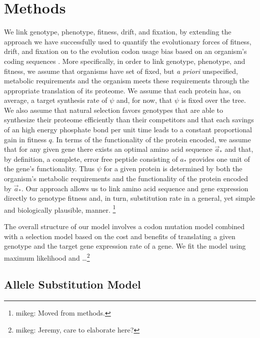 \documentclass{article}
\newcommand{\aopt}{\ensuremath{a_*}\xspace}
\newcommand{\aoptvec}{\ensuremath{\Vec{a}_*}\xspace}
\begin{document}
\section*{Methods}\label{sec:methods}
We link genotype, phenotype, fitness, drift, and fixation, by extending the approach we have successfully used to quantify the evolutionary forces of fitness, drift, and fixation  on to the evolution codon usage bias based on an organism's coding sequences \citep{GilchristAndWagner2006,Gilchrist2007,ShahAndGilchrist2011,GilchristEtAl2015}.
More specifically, in order to link genotype, phenotype, and fitness, we assume that organisms have set of fixed, but \emph{a priori} unspecified, metabolic requirements and the organism meets these requirements through the appropriate translation of its proteome.
We assume that each protein has, on average, a target synthesis rate of $\psi$ and, for now, that $\psi$ is fixed over the tree.
We also assume that natural selection favors genotypes that are able to synthesize their proteome efficiently than their competitors and that each savings of an high energy phosphate bond per unit time leads to a constant proportional gain in fitness $q$.
In terms of the functionality of the protein encoded, we assume that for any given gene there exists an optimal amino acid sequence \aoptvec and that, by definition, a complete, error free peptide consisting of \aopt provides one unit of the gene's functionality.
Thus $\psi$ for a given protein is determined by both the organism's metabolic requirements and the functionality of the protein encoded by \aoptvec.
Our approach allows us to link amino acid sequence and gene expression directly to genotype fitness and, in turn, substitution rate in a general, yet simple and biologically plausible, manner.
\footnote{mikeg: Moved from methods.}

The overall structure of our model involves a codon mutation model combined with a selection model based on the cost and benefits of translating a given genotype and the target gene expression rate of a gene.
We fit the model using maximum likelihood and \ldots \footnote{mikeg: Jeremy, care to elaborate here?}

\subsection*{Allele Substitution Model}
\end{document}
